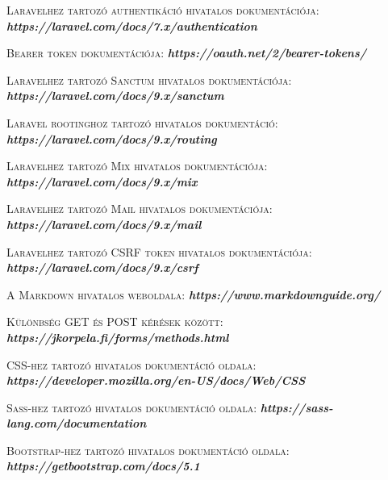 \documentclass[
]{thesis-ekf}
\theoremstyle{definition}
\theoremstyle{remark}
\begin{document}
\begin{thebibliography}{2}
		\textsc{Laravelhez tartozó authentikáció hivatalos dokumentációja:}
		\newline
		\emph{\bf{https://laravel.com/docs/7.x/authentication}}
		
		\textsc{Bearer token dokumentációja:}
		\newline
		\emph{\bf{https://oauth.net/2/bearer-tokens/}}
		
		\textsc{Laravelhez tartozó Sanctum hivatalos dokumentációja:}
		\newline
		\emph{\bf{https://laravel.com/docs/9.x/sanctum}}
		
		\textsc{Laravel rootinghoz tartozó hivatalos dokumentáció:}
		\newline
		\emph{\bf{https://laravel.com/docs/9.x/routing}}
		
		\textsc{Laravelhez tartozó Mix hivatalos dokumentációja:}
		\newline
		\emph{\bf{https://laravel.com/docs/9.x/mix}}
		
		\textsc{Laravelhez tartozó Mail hivatalos dokumentációja:}
		\newline
		\emph{\bf{https://laravel.com/docs/9.x/mail}}
		
		\textsc{Laravelhez tartozó CSRF token hivatalos dokumentációja:}
		\newline
		\emph{\bf{https://laravel.com/docs/9.x/csrf}}
		
		\textsc{A Markdown hivatalos weboldala:}
		\newline
		\emph{\bf{https://www.markdownguide.org/}}
		
		\textsc{Különbség GET és POST kérések között:}
		\newline
		\emph{\bf{https://jkorpela.fi/forms/methods.html}}
		
		\textsc{CSS-hez tartozó hivatalos dokumentáció oldala:}
		\newline
		\emph{\bf{https://developer.mozilla.org/en-US/docs/Web/CSS}}
		
		\textsc{Sass-hez tartozó hivatalos dokumentáció oldala:}
		\newline
		\emph{\bf{https://sass-lang.com/documentation}}
		
		\textsc{Bootstrap-hez tartozó hivatalos dokumentáció oldala:}
		\newline
		\emph{\bf{https://getbootstrap.com/docs/5.1}}
		

\end{thebibliography}
\end{document}
